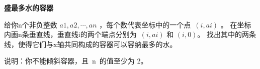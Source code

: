\textbf{盛最多水的容器}\par

给你n个非负整数 $ a1, a2, \cdots, an $ ，每个数代表坐标中的一个点 $ (i, ai) $ 。
在坐标内画n条垂直线，垂直线i的两个端点分别为 $ (i, ai) $ 和 $ (i, 0) $。
找出其中的两条线，使得它们与x轴共同构成的容器可以容纳最多的水。\par

说明：你不能倾斜容器，且 n 的值至少为 2。\par
